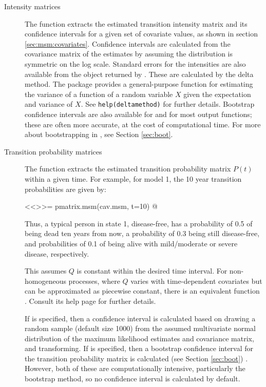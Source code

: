 \begin{description}

\item[Intensity matrices] The function 
  extracts the estimated transition intensity matrix and its confidence intervals
  for a given set of covariate values, as shown in
  section \ref{sec:msm:covariates}.  Confidence intervals are
  calculated from the covariance matrix of the estimates by assuming
  the distribution is symmetric on the log scale.  Standard errors for
  the intensities are also available from the object returned by
  .  These are calculated by the delta method.
  The  package provides a general-purpose function
   for estimating the variance of a function of
  a random variable $X$ given the expectation and variance of $X$. See
  \texttt{help(deltamethod)} for further details.  Bootstrap
  confidence intervals are also available for 
  and for most output functions; these are often more accurate, at the
  cost of computational time.  For more about bootstrapping in
  , see Section \ref{sec:boot}.

\item[Transition probability matrices] The function
   extracts the estimated transition probability
  matrix $P(t)$ within a given time. For example, for model 1, the 10
  year transition probabilities are given by:

<<>>=
pmatrix.msm(cav.msm, t=10)
@

  Thus, a typical person in state 1, disease-free, has a probability
  of 0.5 of being dead ten years from now, a probability of 0.3 being
  still disease-free, and probabilities of 0.1 of being alive with
  mild/moderate or severe disease, respectively.

  This assumes $Q$ is constant within the desired time interval.  For
  non-homogeneous processes, where $Q$ varies with time-dependent
  covariates but can be approximated as piecewise constant, there is
  an equivalent function .  Consult its
  help page for further details.

  If  is specified, then a confidence interval is
  calculated based on drawing a random sample (default size 1000) from
  the assumed multivariate normal distribution of the maximum
  likelihood estimates and covariance matrix, and transforming.  If
   is specified, then a bootstrap confidence
  interval for the transition probability matrix is calculated (see Section \ref{sec:boot}) .
  However, both of these are computationally intensive, particularly
  the bootstrap method, so no confidence interval is calculated by default.


\end{description}
